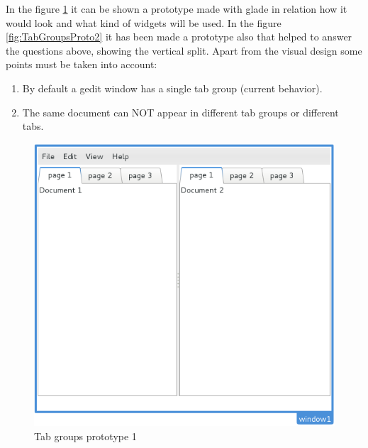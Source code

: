 In the figure \ref{fig:TabGroupsProto1} it can be shown a prototype made with glade in relation how it would look and what kind of widgets will be used. In the figure \ref{fig:TabGroupsProto2} it has been made a prototype also that helped to answer the questions above, showing the vertical split. Apart from the visual design some points must be taken into account:
\begin{enumerate}
  \item By default a gedit window has a single tab group (current behavior).
  \item The same document can NOT appear in different tab groups or different tabs.
\end{enumerate}

\begin{figure}[H]
  \begin{minipage}[b]{0.5\linewidth}
    \centering
    \includegraphics[scale=0.40]{./images/tab-groups-proto-1}
    \caption{Tab groups prototype 1}\label{fig:TabGroupsProto1}
  \end{minipage}
  \hspace{0.5cm}
  \begin{minipage}[b]{0.5\linewidth}
    \centering

\end{minipage}
\end{figure}
